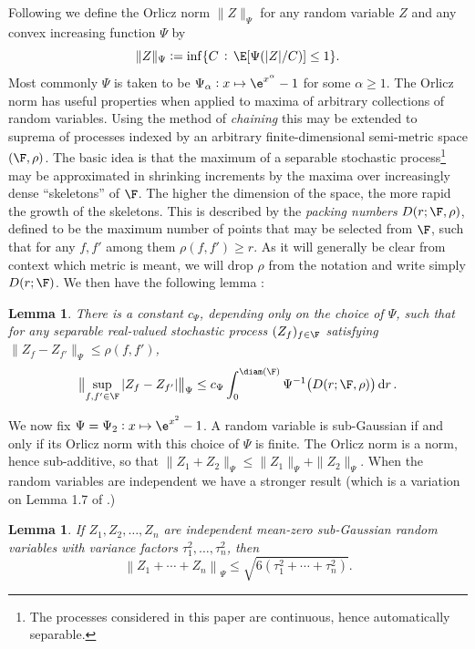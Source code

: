 \documentclass[11pt]{amsart}
\newtheorem{lemma}[Thm]{Lemma}
\begin{document}
Following \cite{VW96} we define the Orlicz norm 
$\|Z\|_{\Psi}$ for any random variable $Z$ and any convex increasing function $\Psi$ by
\begin{equation} \label{E:orlicz}
	\|Z\|_\Psi:=\inf\{ C \,:\, \E[\Psi(|Z|/C)]\le 1\}.
\end{equation}
Most commonly $\Psi$ is taken to be $\Psi_\alpha: x \mapsto \e^{x^{\alpha}} -1$ for some $\alpha \ge 1$. 
The Orlicz norm has useful properties when applied to maxima
of arbitrary collections of random variables. 
Using the method of {\em chaining} this may be extended to suprema of processes
indexed by an arbitrary finite-dimensional semi-metric space $(\F,\rho)$.
The basic idea is that the maximum of a separable stochastic process\footnote{The processes considered in this paper are
	continuous, hence automatically separable.} may be approximated in shrinking increments by the maxima over
increasingly dense ``skeletons'' of $\F$. 
The higher the dimension of the space, the more rapid the growth of the skeletons.
This is described by the {\em packing numbers} $D(r; \F,\rho)$, defined to be the maximum number of points
that may be selected from $\F$, such that for any $f,f'$ among them $\rho(f,f')\ge r$. 
As it will generally be clear from context which metric is meant, we will drop $\rho$ from the notation
and write simply $D(r;\F)$.
We then have the following lemma \cite[Corollary 2.2.5]{VW96}:
\begin{lemma} \label{L:chaining}
	There is a constant $c_\Psi$, depending only on the choice of $\Psi$,
	such that for any separable real-valued stochastic process $(Z_f)_{f\in \F}$ satisfying $\| Z_f - Z_{f'} \|_\Psi \le \rho(f,f')$,
	\begin{equation} \label{E:chaining}
		\bigl\| \sup_{f,f'\in\F} |Z_f - Z_{f'}| \bigr\|_\Psi \le c_\Psi \int_0^{\diam(\F)} \Psi^{-1} \bigl( D(r ; \F, \rho ) \bigr) \dif r \, .
	\end{equation}
\end{lemma}

We now fix $\Psi=\Psi_2: x \mapsto \e^{x^2}-1$. 
A random variable is sub-Gaussian if and only if its Orlicz norm with this choice of $\Psi$ is finite.
The Orlicz norm is a norm, hence sub-additive, so that $\| Z_1 + Z_2\|_\Psi \le \| Z_1\|_\Psi + \| Z_2\|_\Psi$.
When the random variables are independent we have a stronger result
(which is a variation on Lemma 1.7 of \cite{BK00}.)
\begin{lemma} \label{L:orlicz}
	If $Z_1,Z_2,\dots,Z_n$ are independent mean-zero sub-Gaussian random variables
	with variance factors $\tau^2_1,\dots,\tau^2_n$, then
	\begin{equation} \label{E:orlicznbound}
		\left\| Z_1 + \cdots + Z_n\right\|_\Psi
		\le \sqrt{6(\tau^2_1+\cdots + \tau^2_n)} .
	\end{equation}
\end{lemma}
\end{document}

